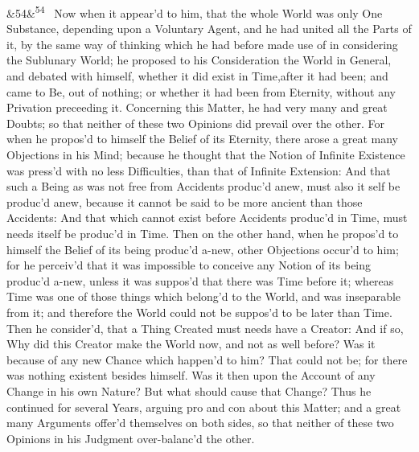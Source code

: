 \documentclass[12pt]{article}
\newcommand{\para}[1][]{\par\noindent\ifx&#1&\else\textsuperscript{\footnotesize #1}~\fi}
\begin{document}
\para[54] Now when it appear'd to him, that the whole World was only One Substance, depending upon a Voluntary Agent, and he had united all the Parts of it, by the same way of thinking which he had before made use of in considering the Sublunary World; he proposed to his Consideration the World in General, and debated with himself, whether it did exist in Time,after it had been; and came to Be, out of nothing; or whether it had been from Eternity, without any Privation preceeding it. Concerning this Matter, he had very many and great Doubts; so that neither of these two Opinions did prevail over the other. For when he propos'd to himself the Belief of its Eternity, there arose a great many Objections in his Mind; because he thought that the Notion of Infinite Existence was press'd with no less Difficulties, than that of Infinite Extension: And that such a Being as was not free from Accidents produc'd anew, must also it self be produc'd anew, because it cannot be said to be more ancient than those Accidents: And that which cannot exist before Accidents produc'd in Time, must needs itself be produc'd in Time. Then on the other hand, when he propos'd to himself the Belief of its being produc'd a-new, other Objections occur'd to him; for he perceiv'd that it was impossible to conceive any Notion of its being produc'd a-new, unless it was suppos'd that there was Time before it; whereas Time was one of those things which belong'd to the World, and was inseparable from it; and therefore the World could not be suppos'd to be later than Time. Then he consider'd, that a Thing Created must needs have a Creator: And if so, Why did this Creator make the World now, and not as well before? Was it because of any new Chance which happen'd to him? That could not be; for there was nothing existent besides himself. Was it then upon the Account of any Change in his own Nature? But what should cause that Change? Thus he continued for several Years, arguing pro and con about this Matter; and a great many Arguments offer'd themselves on both sides, so that neither of these two Opinions in his Judgment over-balanc'd the other.
\end{document}
